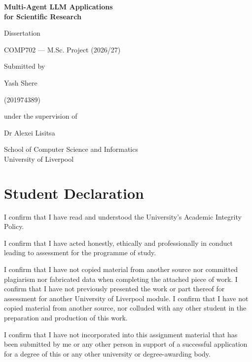 \begin{titlepage}
\centering
\vspace*{3cm}
{\LARGE\bfseries Multi-Agent LLM Applications\\[0.3em] for Scientific Research\par}
\vspace{1.5cm}
{\Large Dissertation\par}
\vspace{0.5cm}
{\large COMP702 --- M.Sc. Project (2026/27)\par}
\vspace{2cm}
{\large Submitted by\par}
\vspace{0.3cm}
{\Large Yash Shere\par}
{\large (201974389)\par}
\vspace{1.5cm}
{\large under the supervision of\par}
\vspace{0.3cm}
{\Large Dr Alexei Lisitsa\par}
\vfill
{\large School of Computer Science and Informatics\\ University of Liverpool\par}
\vspace{1cm}
\end{titlepage}

\chapter*{Student Declaration}
I confirm that I have read and understood the University's Academic Integrity Policy.

I confirm that I have acted honestly, ethically and professionally in conduct leading to
assessment for the programme of study.

I confirm that I have not copied material from another source nor committed plagiarism nor
fabricated data when completing the attached piece of work. I confirm that I have not
previously presented the work or part thereof for assessment for another University of
Liverpool module. I confirm that I have not copied material from another source, nor colluded
with any other student in the preparation and production of this work.

I confirm that I have not incorporated into this assignment material that has been submitted
by me or any other person in support of a successful application for a degree of this or any
other university or degree-awarding body.


